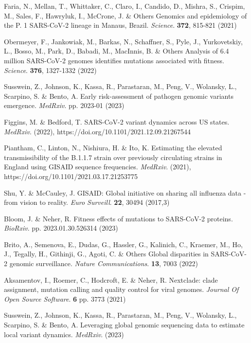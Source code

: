 \documentclass[10pt,letterpaper]{article}
\begin{document}
\begin{thebibliography}{10}
Faria, N., Mellan, T., Whittaker, C., Claro, I., Candido, D., Mishra, S., Crispim, M., Sales, F., Hawryluk, I., McCrone, J. \& Others Genomics and epidemiology of the P. 1 SARS-CoV-2 lineage in Manaus, Brazil. {\em Science}. \textbf{372}, 815-821 (2021)

Obermeyer, F., Jankowiak, M., Barkas, N., Schaffner, S., Pyle, J., Yurkovetskiy, L., Bosso, M., Park, D., Babadi, M., MacInnis, B. \& Others Analysis of 6.4 million SARS-CoV-2 genomes identifies mutations associated with fitness. {\em Science}. \textbf{376}, 1327-1332 (2022)

Susswein, Z., Johnson, K., Kassa, R., Parastaran, M., Peng, V., Wolansky, L., Scarpino, S. \& Bento, A. Early risk-assessment of pathogen genomic variants emergence. {\em MedRxiv}. pp. 2023-01 (2023)

Figgins, M. \& Bedford, T. SARS-CoV-2 variant dynamics across US states. {\em MedRxiv}. (2022), https://doi.org/10.1101/2021.12.09.21267544

Piantham, C., Linton, N., Nishiura, H. \& Ito, K. Estimating the elevated transmissibility of the B.1.1.7 strain over previously circulating strains in England using GISAID sequence frequencies. {\em MedRxiv}. (2021), https://doi.org/10.1101/2021.03.17.21253775

Shu, Y. \& McCauley, J. GISAID: Global initiative on sharing all influenza data - from vision to reality. {\em Euro Surveill}. \textbf{22}, 30494 (2017,3)

Bloom, J. \& Neher, R. Fitness effects of mutations to SARS-CoV-2 proteins. {\em BioRxiv}. pp. 2023.01.30.526314 (2023)

Brito, A., Semenova, E., Dudas, G., Hassler, G., Kalinich, C., Kraemer, M., Ho, J., Tegally, H., Githinji, G., Agoti, C. \& Others Global disparities in SARS-CoV-2 genomic surveillance. {\em Nature Communications}. \textbf{13}, 7003 (2022)

Aksamentov, I., Roemer, C., Hodcroft, E. \& Neher, R. Nextclade: clade assignment, mutation calling and quality control for viral genomes. {\em Journal Of Open Source Software}. \textbf{6} pp. 3773 (2021)

Susswein, Z., Johnson, K., Kassa, R., Parastaran, M., Peng, V., Wolansky, L., Scarpino, S. \& Bento, A. Leveraging global genomic sequencing data to estimate local variant dynamics. {\em MedRxiv}. (2023)


\end{thebibliography}
\end{document}
